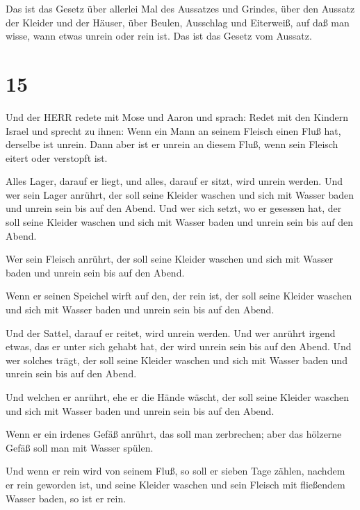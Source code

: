  Das ist das Gesetz über allerlei Mal des Aussatzes und
Grindes,  über den Aussatz der Kleider und der Häuser,
 über Beulen, Ausschlag und Eiterweiß,  auf
daß man wisse, wann etwas unrein oder rein ist. Das ist das Gesetz vom
Aussatz.

\hypertarget{section-14}{%
\section{15}\label{section-14}}

 Und der HERR redete mit Mose und Aaron und sprach:
 Redet mit den Kindern Israel und sprecht zu ihnen: Wenn ein
Mann an seinem Fleisch einen Fluß hat, derselbe ist unrein. 
Dann aber ist er unrein an diesem Fluß, wenn sein Fleisch eitert oder
verstopft ist.

 Alles Lager, darauf er liegt, und alles, darauf er sitzt,
wird unrein werden.  Und wer sein Lager anrührt, der soll
seine Kleider waschen und sich mit Wasser baden und unrein sein bis auf
den Abend.  Und wer sich setzt, wo er gesessen hat, der soll
seine Kleider waschen und sich mit Wasser baden und unrein sein bis auf
den Abend.

 Wer sein Fleisch anrührt, der soll seine Kleider waschen
und sich mit Wasser baden und unrein sein bis auf den Abend.

 Wenn er seinen Speichel wirft auf den, der rein ist, der
soll seine Kleider waschen und sich mit Wasser baden und unrein sein bis
auf den Abend.

 Und der Sattel, darauf er reitet, wird unrein werden.
 Und wer anrührt irgend etwas, das er unter sich gehabt
hat, der wird unrein sein bis auf den Abend. Und wer solches trägt, der
soll seine Kleider waschen und sich mit Wasser baden und unrein sein bis
auf den Abend.

 Und welchen er anrührt, ehe er die Hände wäscht, der soll
seine Kleider waschen und sich mit Wasser baden und unrein sein bis auf
den Abend.

 Wenn er ein irdenes Gefäß anrührt, das soll man
zerbrechen; aber das hölzerne Gefäß soll man mit Wasser spülen.

 Und wenn er rein wird von seinem Fluß, so soll er sieben
Tage zählen, nachdem er rein geworden ist, und seine Kleider waschen und
sein Fleisch mit fließendem Wasser baden, so ist er rein.

